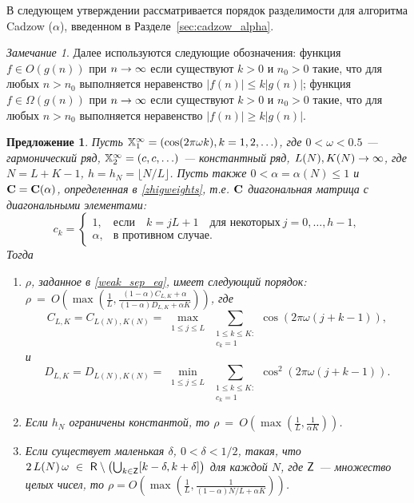 \documentclass[12pt, specialist, subf,href,colorlinks=true,substylefile = spbu.rtx]{disser}
\newtheorem{proposition}{Предложение}
\theoremstyle{remark}
\newtheorem{remark}{Замечание}
\theoremstyle{definition}
\begin{document}
\smallskip
В следующем утверждении рассматривается порядок разделимости для алгоритма Cadzow ($\alpha$), введенном в Разделе~\ref{sec:cadzow_alpha}.


\begin{remark}
	Далее используются следующие обозначения:
	функция $f \in O(g(n))$ при $n\rightarrow \infty$ если существуют $k>0$ и $n_0>0$ такие, что для любых $n > n_0$ выполняется неравенство $|f(n)| \le k |g(n)|$;
	функция $f \in \Omega(g(n))$ при $n\rightarrow \infty$ если существуют $k>0$ и $n_0>0$ такие, что для любых $n > n_0$ выполняется неравенство $|f(n)| \ge k |g(n)|$.
\end{remark}


\begin{proposition}
	\label{prop:separ1}
	Пусть $\mathbb{X}_1^\infty = (\cos(2 \pi \omega k), k = 1, 2, \ldots)$, где $0<\omega <0.5$ --- гармонический ряд, $\mathbb{X}_2^\infty = (c, c, \ldots)$ --- константный ряд,  $L(N),K(N)\rightarrow \infty$, где $N=L+K-1$, $h = h_N = \lfloor N/L \rfloor$. Пусть также $0<\alpha=\alpha(N)\le 1$ и $\mathbf{C}=\mathbf{C}(\alpha)$, определенная в \eqref{zhigweights}, т.е. $\mathbf{C}$ диагональная матрица с диагональными элементами:
	\begin{equation*}
	c_k = \begin{cases}
	1, & \text{если} \quad k = jL+1 \quad \text{для некоторых} \ j = 0, \ldots, h-1,\\
	\alpha, & \text{в противном случае}.
	\end{cases}
	\end{equation*}
	Тогда
	\begin{enumerate}
		\item $\rho$, заданное в \eqref{weak_sep_eq}, имеет следующий порядок: $\rho~=~O\left(\max\left(\frac{1}{L}, \frac{(1-\alpha)C_{L,K}+\alpha}{(1-\alpha)D_{L,K}+\alpha K}\right)\right)$, где
		\begin{equation*}
		C_{L,K} = C_{L(N),K(N)} = \max_{\substack{1 \le j \le L}}  \sum_{\substack{1 \le k \le K: \\ c_k = 1}}\cos(2 \pi \omega (j + k - 1)),		\end{equation*} и
		\begin{equation*}
		D_{L,K} = D_{L(N),K(N)} = \min_{\substack{1 \le j \le L}} \sum_{\substack{1 \le k \le K: \\ c_k = 1}}\cos^2(2 \pi \omega (j + k - 1)).
		\end{equation*}
		\item Если $h_N$ ограничены константой, то $\rho~=~O\left(\max\left(\frac{1}{L}, \frac{1}{\alpha K}\right)\right)$.
		\item Если существует маленькая $\delta$, $0 < \delta < 1/2$, такая, что $2\,L(N)\,\omega~\in~ \mathsf{R} \setminus \left(\bigcup_{k \in \mathsf{Z}} [k - \delta, k + \delta] \right)$ для каждой $N$, где $\mathsf{Z}$ --- множество целых чисел, то $\rho = O\left(\max\left(\frac{1}{L}, \frac{1}{(1-\alpha)N/L+\alpha K}\right)\right)$.
	\end{enumerate}
	
\end{proposition}
\end{document}
